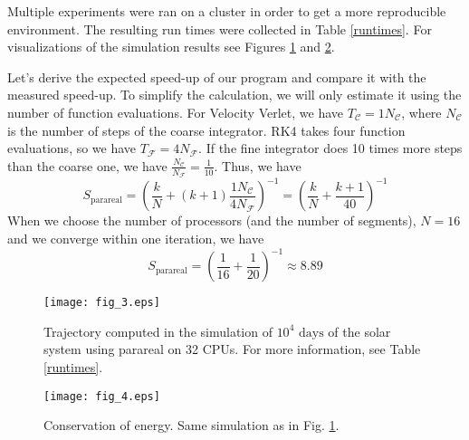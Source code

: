 \documentclass[conference]{IEEEtran}
\begin{document}
Multiple experiments were ran on a cluster in order to get a more reproducible environment. The resulting run times were collected in Table \ref{runtimes}. For visualizations of the simulation results see Figures \ref{sim} and \ref{energy}.

Let's derive the expected speed-up of our program and compare it with the measured speed-up. To simplify the calculation, we will only estimate it using the number of function evaluations. For Velocity Verlet, we have $T_\mathcal{C} = 1N_\mathcal{C}$, where $N_\mathcal{C}$ is the number of steps of the coarse integrator. RK4 takes four function evaluations, so we have $T_\mathcal{F} = 4N_\mathcal{F}$. If the fine integrator does 10 times more steps than the coarse one, we have $\frac{N_\mathcal{C}}{N_\mathcal{F}} = \frac{1}{10}$. Thus, we have
$$
S_\text{parareal} = \left(\frac{k}{N} + (k+1)\frac{1N_\mathcal{C}}{4N_\mathcal{F}}\right)^{-1} = \left(\frac{k}{N} + \frac{k+1}{40}\right)^{-1}
$$
When we choose the number of processors (and the number of segments), $N = 16$ and we converge within one iteration, we have
$$
S_\text{parareal} = \left(\frac{1}{16} + \frac{1}{20}\right)^{-1} \approx 8.89
$$

\begin{figure}[htbp]
\centerline{\texttt{[image: fig\_3.eps]}}
\caption{Trajectory computed in the simulation of $10^4\text{ days}$ of the solar system using parareal on 32 CPUs. For more information, see Table \ref{runtimes}.}
\label{sim}
\end{figure}

\begin{figure}[htbp]
\centerline{\texttt{[image: fig\_4.eps]}}
\caption{Conservation of energy. Same simulation as in Fig. \ref{sim}.}
\label{energy}
\end{figure}
\end{document}
